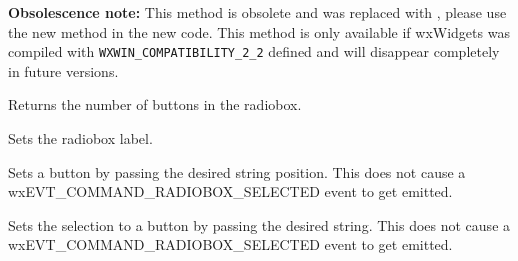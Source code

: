 {\bf Obsolescence note:} This method is obsolete and was replaced with
, please use the new method in the new
code. This method is only available if wxWidgets was compiled with
{\tt WXWIN\_COMPATIBILITY\_2\_2} defined and will disappear completely in
future versions.

Returns the number of buttons in the radiobox.


\label{wxradioboxsetlabel}


Sets the radiobox label.







\label{wxradioboxsetselection}


Sets a button by passing the desired string position. This does not cause
a wxEVT\_COMMAND\_RADIOBOX\_SELECTED event to get emitted.




\label{wxradioboxsetstringselection}


Sets the selection to a button by passing the desired string. This does not cause
a wxEVT\_COMMAND\_RADIOBOX\_SELECTED event to get emitted.




\label{wxradioboxshow}


